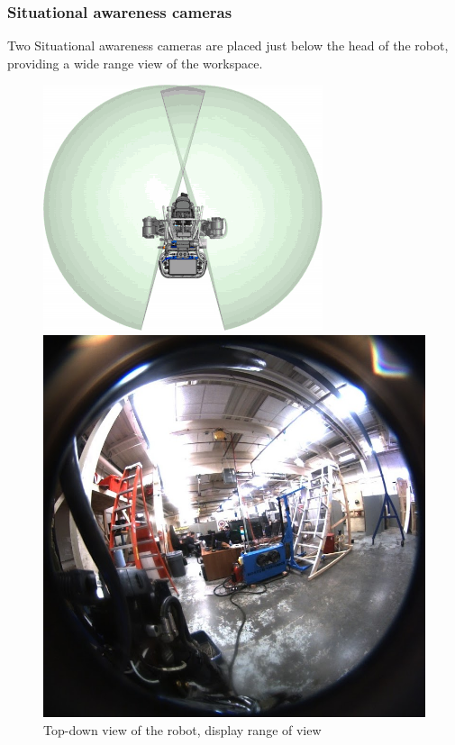 \documentclass{article}
\begin{document}
\subsubsection{Situational awareness cameras}

Two Situational awareness cameras are placed just below the head of the robot, providing a wide range view of the workspace.

\begin{figure}[ht]
\begin{center}
\begin{minipage}[b]{0.4\linewidth}
\centering
\includegraphics[width=\textwidth]{images/sitcamFOV.png}
\caption{Top-down view of the robot, display range of view}
\label{fig:figure1}
\end{minipage}
\hspace{0.5cm}
\begin{minipage}[b]{0.4\linewidth}
\centering
\includegraphics[width=\textwidth]{images/fisheye.jpg}

\end{minipage}
\end{center}
\end{figure}
\end{document}
